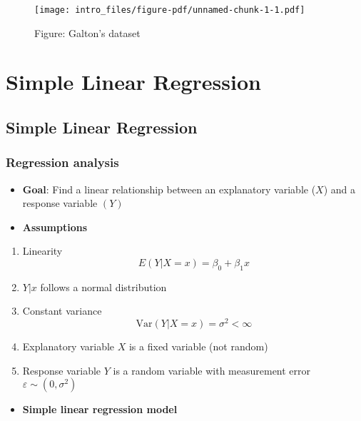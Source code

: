 \documentclass[
  letterpaper,
  DIV=11,
  numbers=noendperiod]{scrreprt}
\providecommand{\tightlist}{%
  \setlength{\itemsep}{0pt}\setlength{\parskip}{0pt}}\usepackage{longtable,booktabs,array}
\theoremstyle{definition}
\theoremstyle{plain}
\theoremstyle{remark}
\begin{document}
\begin{figure}[H]

{\centering \texttt{[image: intro\_files/figure-pdf/unnamed-chunk-1-1.pdf]}

}

\caption{Figure: Galton's dataset}

\end{figure}%

\part{Simple Linear Regression}

\chapter{Simple Linear Regression}\label{simple-linear-regression-1}

\section{Regression analysis}\label{regression-analysis}

\begin{itemize}
\item
  \textbf{Goal}: Find a linear relationship between an explanatory
  variable (\(X\)) and a response variable \((Y)\)
\item
  \textbf{Assumptions}
\end{itemize}

\begin{enumerate}
\def\labelenumi{\arabic{enumi}.}
\item
  Linearity \[
  E(Y|X=x) = \beta_0 + \beta_1 x
  \]
\item
  \(Y|x\) follows a normal distribution
\item
  Constant variance \[
  \text{Var}(Y|X=x)=\sigma^2 <\infty
  \]
\item
  Explanatory variable \(X\) is a fixed variable (not random)
\item
  Response variable \(Y\) is a random variable with measurement error
  \(\varepsilon \sim (0, \sigma^2)\)
\end{enumerate}

\begin{itemize}
\tightlist
\item
  \textbf{Simple linear regression model}
\end{itemize}
\end{document}
